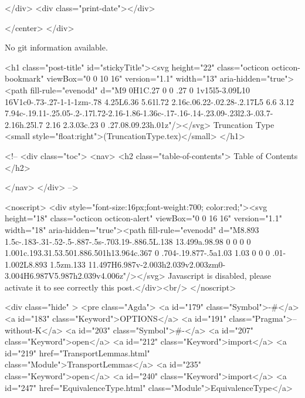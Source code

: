           
        </div>
        <div class="print-date"></div>
        
        
    </center>
  </div>

  
  No git information available.
  

  <h1 class="post-title" id="stickyTitle"><svg height="22" class="octicon octicon-bookmark" viewBox="0 0 10 16" version="1.1" width="13" aria-hidden="true"><path fill-rule="evenodd" d="M9 0H1C.27 0 0 .27 0 1v15l5-3.09L10 16V1c0-.73-.27-1-1-1zm-.78 4.25L6.36 5.61l.72 2.16c.06.22-.02.28-.2.17L5 6.6 3.12 7.94c-.19.11-.25.05-.2-.17l.72-2.16-1.86-1.36c-.17-.16-.14-.23.09-.23l2.3-.03.7-2.16h.25l.7 2.16 2.3.03c.23 0 .27.08.09.23h.01z"/></svg> Truncation Type <small style="float:right">(TruncationType.tex)</small>
  </h1>

  <!-- 
  <div class="toc">
    <nav>
    <h2 class="table-of-contents"> Table of Contents </h2>
      

    </nav>
  </div>
   -->

  <noscript>
  <div style="font-size:16px;font-weight:700; color:red;"><svg height="18" class="octicon octicon-alert" viewBox="0 0 16 16" version="1.1" width="18" aria-hidden="true"><path fill-rule="evenodd" d="M8.893 1.5c-.183-.31-.52-.5-.887-.5s-.703.19-.886.5L.138 13.499a.98.98 0 0 0 0 1.001c.193.31.53.501.886.501h13.964c.367 0 .704-.19.877-.5a1.03 1.03 0 0 0 .01-1.002L8.893 1.5zm.133 11.497H6.987v-2.003h2.039v2.003zm0-3.004H6.987V5.987h2.039v4.006z"/></svg> Javascript is disabled, please activate it to see correctly this post.</div><br/>
  </noscript>

  <div class="hide" >
<pre class="Agda">
<a id="179" class="Symbol">{-#</a> <a id="183" class="Keyword">OPTIONS</a> <a id="191" class="Pragma">--without-K</a> <a id="203" class="Symbol">#-}</a>
<a id="207" class="Keyword">open</a> <a id="212" class="Keyword">import</a> <a id="219" href="TransportLemmas.html" class="Module">TransportLemmas</a>
<a id="235" class="Keyword">open</a> <a id="240" class="Keyword">import</a> <a id="247" href="EquivalenceType.html" class="Module">EquivalenceType</a>

